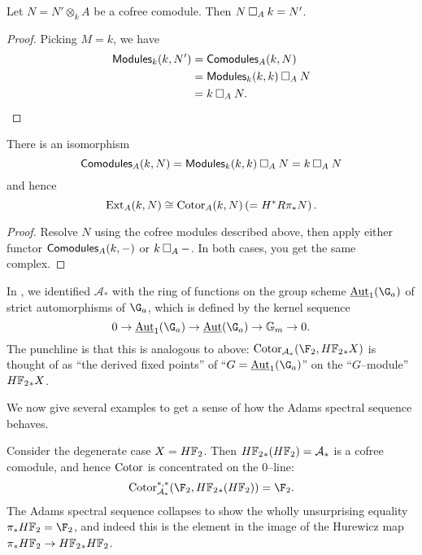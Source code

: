 \begin{corollary}\label{CotensorReducesCofreeness}
Let $N = N' \otimes_k A$ be a cofree comodule. Then $N \mathbin\square_A k = N'$.
\end{corollary}
\begin{proof}
Picking $M = k$, we have
\begin{align*}
\mathsf{Modules}_k(k, N') & = \mathsf{Comodules}_A(k, N) \\
& = \mathsf{Modules}_k(k, k) \mathbin\square_A N \\
& = k \mathbin\square_A N. \qedhere
\end{align*}
\end{proof}

\begin{corollary}\label{ExtAndCotorAgree}
There is an isomorphism \[\mathsf{Comodules}_A(k, N) = \mathsf{Modules}_k(k, k) \mathbin\square_A N = k \mathbin\square_A N\] and hence \[\operatorname{Ext}_A(k, N) \cong \operatorname{Cotor}_A(k, N) \left(= H^* R\pi_* N\right).\]
\end{corollary}
\begin{proof}
Resolve $N$ using the cofree modules described above, then apply either functor $\mathsf{Comodules}_A(k, -)$ or $k \mathbin\square_A -$.  In both cases, you get the same complex.
\end{proof}

\begin{example}\label{HF2HomologyIsValuedInAutGaEquivarModules}
In , we identified $\mathcal A_*$ with the ring of functions on the group scheme $\InternalAut_1(\G_a)$ of strict automorphisms of $\G_a$, which is defined by the kernel sequence \[0 \to \InternalAut_1(\G_a) \to \InternalAut(\G_a) \to \Gm \to 0.\]  The punchline is that this is analogous to  above: $\Cotor_{\mathcal A_*}(\F_2, \HFtwo_* X)$ is thought of as ``the derived fixed points'' of ``$G = \InternalAut_1(\G_a)$'' on the ``$G$--module'' $\HFtwo_* X$.
\end{example}

We now give several examples to get a sense of how the Adams spectral sequence behaves.

\begin{example}
Consider the degenerate case $X = \HFtwo$.  Then $\HFtwo_*(\HFtwo) = \mathcal A_*$ is a cofree comodule, and hence $\operatorname{Cotor}$ is concentrated on the $0$--line: \[\Cotor_{\mathcal A_*}^{*, *}(\F_2, \HFtwo_*(\HFtwo)) = \F_2.\]  The Adams spectral sequence collapses to show the wholly unsurprising equality $\pi_* \HFtwo = \F_2$, and indeed this is the element in the image of the Hurewicz map $\pi_* \HFtwo \to \HFtwo_* \HFtwo$.
\end{example}

